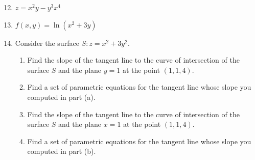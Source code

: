 \documentclass[12pt]{article}
\newif\ifans
\begin{document}
\begin{enumerate}
\setcounter{enumi}{11}

\item $z=x^2y-y^3x^4$ 

\ifans{\fbox{$\frac{\partial^2z}{\partial x^2}=2y-12x^2y^3$; $\frac{\partial^2z}{\partial y \partial x}=2x-12x^3y^2$; $\frac{\partial^2z}{\partial x \partial y}=2x-12x^3y^2$; $\frac{\partial^2z}{\partial y^2}=-6x^4y$}} \fi

\item $f(x,y)=\ln{(x^2+3y)}$ 

\ifans{\fbox{\parbox{0.6\linewidth}{$f_{xx}(x,y)=\frac{-2x^2+6y}{(x^2+3y)^2}$; $f_{xy}(x,y)=-\frac{6x}{(x^2+3y)^2}$;\\ $f_{yx}(x,y)=-\frac{6x}{(x^2+3y)^2}$; $f_{yy}(x,y)=-\frac{9}{(x^2+3y)^2}$}}} \fi

\item Consider the surface $S: z=x^2+3y^2$.  

\begin{enumerate}

\item Find the slope of the tangent line to the curve of intersection of the surface $S$ and the plane $y=1$ at the point $(1,1,4)$.

\ifans{\fbox{2; Detailed Solution: \textcolor{blue}{\href{http://www.math.drexel.edu/classes/Calculus/resources/Math200HW/Solutions/10_200_Partial_14.pdf}{Here}} }} \fi

\item Find a set of parametric equations for the tangent line whose slope you computed in part (a).  

\ifans{\fbox{\parbox{1\linewidth}{There are many possible parameterizations.  One possibility is $x=1+t$, $y=1$, $z=4+2t$. Detailed Solution: \textcolor{blue}{\href{http://www.math.drexel.edu/classes/Calculus/resources/Math200HW/Solutions/10_200_Partial_14.pdf}{Here}} }}} \fi

\item Find the slope of the tangent line to the curve of intersection of the surface $S$ and the plane $x=1$ at the point $(1,1,4)$.

\ifans{\fbox{6; Detailed Solution: \textcolor{blue}{\href{http://www.math.drexel.edu/classes/Calculus/resources/Math200HW/Solutions/10_200_Partial_14.pdf}{Here}} }} \fi

\item Find a set of parametric equations for the tangent line whose slope you computed in part (b).  


\end{enumerate}
\end{enumerate}
\end{document}
